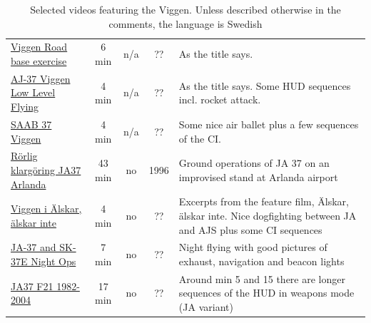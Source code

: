 \documentclass[a4paper]{report}
\begin{document}
\begin{landscape}
\begin{table}[!th]
\begin{tabular}{|p{5cm}|c|c|c|p{9cm}|}
\href{https://www.youtube.com/watch?v=slm9ksxU0HY}{Viggen Road base exercise} & 6 min & n/a & ?? & As the title says.\\
\href{https://www.youtube.com/watch?v=hWrsP3hq5M8}{AJ-37 Viggen Low Level Flying} & 4 min & n/a & ?? & As the title says. Some HUD sequences incl. rocket attack.\\
\href{https://www.youtube.com/watch?v=UOszNlNeRVs}{SAAB 37 Viggen} & 4 min & n/a & ?? & Some nice air ballet plus a few sequences of the CI.\\
\href{https://www.youtube.com/watch?v=IbsYsUvCy7s}{Rörlig klargöring JA37 Arlanda} & 43 min & no & 1996 & Ground operations of JA 37 on an improvised stand at Arlanda airport\\
\href{https://vimeo.com/60091080}{Viggen i Älskar, älskar inte} & 4 min & no & ?? & Excerpts from the feature film, Älskar, älskar inte. Nice dogfighting between JA and AJS plus some CI sequences\\
\href{https://www.youtube.com/watch?v=eT00_OVrv7o}{JA-37 and SK-37E Night Ops} & 7 min & no & ?? & Night flying with good pictures of exhaust, navigation and beacon lights\\
\href{https://www.youtube.com/watch?v=0ocSUd9_5Tw}{JA37 F21 1982-2004} & 17 min & no & ?? & Around min 5 and 15 there are longer sequences of the HUD in weapons mode (JA variant)\\

\hline
\end{tabular}
\caption{Selected videos featuring the Viggen. Unless described otherwise in the comments, the language is Swedish}
\end{table}

\end{landscape}
\end{document}
